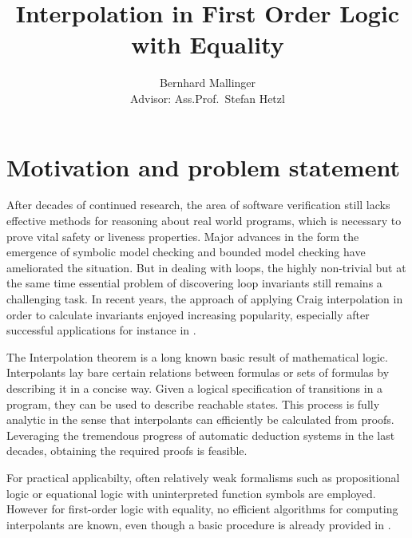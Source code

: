\documentclass[,%
			paper=a4,%
			DIV12,
			liststotoc,
			bibtotoc,
			draft=false,%
			numbers=noendperiod
			]{scrartcl}
\title{Interpolation in First Order Logic with Equality}
\author{Bernhard Mallinger \medskip \\
Advisor: Ass.Prof.\ Stefan Hetzl}
\theoremstyle{definition}
\begin{document}
\maketitle

\section{Motivation and problem statement}
\label{motivation}

After decades of continued research, the area of software verification still lacks effective methods for reasoning about real world programs, which is necessary to prove vital safety or liveness properties.
Major advances in the form the emergence of symbolic model checking and bounded model checking have ameliorated the situation. But in dealing with loops, the highly non-trivial but at the same time essential problem of discovering loop invariants still remains a challenging task. 
In recent years, the approach of applying Craig interpolation in order to calculate invariants enjoyed increasing popularity, especially after successful applications for instance in \cite{McMillan03}.

The Interpolation theorem is a long known basic result of mathematical logic.
Interpolants lay bare certain relations between formulas or sets of formulas by describing it in a concise way. 
Given a logical specification of transitions in a program, they can be used to describe reachable states.
This process is fully analytic in the sense that interpolants can efficiently be calculated from proofs.
Leveraging the tremendous progress of automatic deduction systems in the last decades, obtaining the required proofs is feasible.


For practical applicabilty, often relatively weak formalisms such as propositional logic or equational logic with uninterpreted function symbols are employed.
However for first-order logic with equality, no efficient algorithms for computing interpolants are known, even though a basic procedure is already provided in \cite{craig57linear}.


\begin{comment}
Software verification
Model checking
Derive invariants
interpolation by its nature diregards all but the predicates releant to a certain property
can be used for predicate refinement in cegar

often restricted to weaker logics, application to more powerful formalisms such as fol with equality is relevant 
\end{comment}
\end{document}
